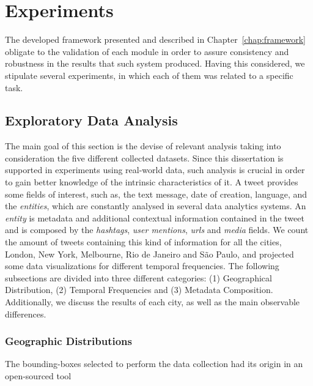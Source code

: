 \chapter{Experiments} \label{chap:experiments}

The developed framework presented and described in Chapter~\ref{chap:framework} obligate to the validation of each module in order to assure consistency and robustness in the results that such system produced. Having this considered, we stipulate several experiments, in which each of them was related to a specific task. 

\section*{}

\section{Exploratory Data Analysis}\label{sec:exploratory_data_analysis}

The main goal of this section is the devise of relevant analysis taking into consideration the five different collected datasets. Since this dissertation is supported in experiments using real-world data, such analysis is crucial in order to gain better knowledge of the intrinsic characteristics of it. A tweet provides some fields of interest, such as, the text message, date of creation, language, and the \emph{entities}, which are constantly analysed in several data analytics systems. An \emph{entity} is metadata and additional contextual information contained in the tweet and is composed by the \emph{hashtags}, \emph{user mentions}, \emph{urls} and \emph{media} fields. We count the amount of tweets containing this kind of information for all the cities, London, New York, Melbourne, Rio de Janeiro and São Paulo, and projected some data visualizations for different temporal frequencies. The following subsections are divided into three different categories:  (1) Geographical Distribution, (2) Temporal Frequencies and (3) Metadata Composition. Additionally, we discuss the results of each city, as well as the main observable differences.

\subsection{Geographic Distributions}

The bounding-boxes selected to perform the data collection had its origin in an open-sourced tool 

